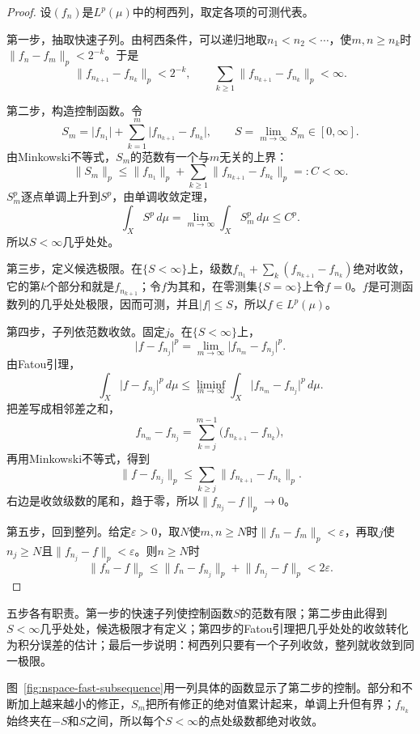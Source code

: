 \begin{proof}
设$(f_n)$是$L^p(\mu)$中的柯西列，取定各项的可测代表。

第一步，抽取快速子列。由柯西条件，可以递归地取$n_1<n_2<\cdots$，使$m,n\geq n_k$时$\lVert f_n-f_m\rVert_p<2^{-k}$。于是
\[
 \lVert f_{n_{k+1}}-f_{n_k}\rVert_p<2^{-k},\qquad \sum_{k\geq1}\lVert f_{n_{k+1}}-f_{n_k}\rVert_p<\infty.
\]

第二步，构造控制函数。令
\[
 S_m=\lvert f_{n_1}\rvert+\sum_{k=1}^m\lvert f_{n_{k+1}}-f_{n_k}\rvert,\qquad S=\lim_{m\to\infty}S_m\in[0,\infty].
\]
由Minkowski不等式，$S_m$的范数有一个与$m$无关的上界：
\[
 \lVert S_m\rVert_p\leq\lVert f_{n_1}\rVert_p+\sum_{k\geq1}\lVert f_{n_{k+1}}-f_{n_k}\rVert_p=:C<\infty.
\]
$S_m^p$逐点单调上升到$S^p$，由单调收敛定理，
\[
 \int_XS^p\,d\mu=\lim_{m\to\infty}\int_XS_m^p\,d\mu\leq C^p.
\]
所以$S<\infty$几乎处处。

第三步，定义候选极限。在$\{S<\infty\}$上，级数$f_{n_1}+\sum_k(f_{n_{k+1}}-f_{n_k})$绝对收敛，它的第$k$个部分和就是$f_{n_{k+1}}$；令$f$为其和，在零测集$\{S=\infty\}$上令$f=0$。$f$是可测函数列的几乎处处极限，因而可测，并且$\lvert f\rvert\leq S$，所以$f\in L^p(\mu)$。

第四步，子列依范数收敛。固定$j$。在$\{S<\infty\}$上，
\[
 \lvert f-f_{n_j}\rvert^p=\lim_{m\to\infty}\lvert f_{n_m}-f_{n_j}\rvert^p.
\]
由Fatou引理，
\[
 \int_X\lvert f-f_{n_j}\rvert^p\,d\mu\leq\liminf_{m\to\infty}\int_X\lvert f_{n_m}-f_{n_j}\rvert^p\,d\mu.
\]
把差写成相邻差之和，
\[
 f_{n_m}-f_{n_j}=\sum_{k=j}^{m-1}\bigl(f_{n_{k+1}}-f_{n_k}\bigr),
\]
再用Minkowski不等式，得到
\[
 \lVert f-f_{n_j}\rVert_p\leq\sum_{k\geq j}\lVert f_{n_{k+1}}-f_{n_k}\rVert_p.
\]
右边是收敛级数的尾和，趋于零，所以$\lVert f_{n_j}-f\rVert_p\to0$。

第五步，回到整列。给定$\varepsilon>0$，取$N$使$m,n\geq N$时$\lVert f_n-f_m\rVert_p<\varepsilon$，再取$j$使$n_j\geq N$且$\lVert f_{n_j}-f\rVert_p<\varepsilon$。则$n\geq N$时
\[
 \lVert f_n-f\rVert_p\leq\lVert f_n-f_{n_j}\rVert_p+\lVert f_{n_j}-f\rVert_p<2\varepsilon.
\]
\end{proof}

五步各有职责。第一步的快速子列使控制函数$S$的范数有限；第二步由此得到$S<\infty$几乎处处，候选极限才有定义；第四步的Fatou引理把几乎处处的收敛转化为积分误差的估计；最后一步说明：柯西列只要有一个子列收敛，整列就收敛到同一极限。

图~\ref{fig:nspace-fast-subsequence}用一列具体的函数显示了第二步的控制。部分和不断加上越来越小的修正，$S_m$把所有修正的绝对值累计起来，单调上升但有界；$f_{n_k}$始终夹在$-S$和$S$之间，所以每个$S<\infty$的点处级数都绝对收敛。

